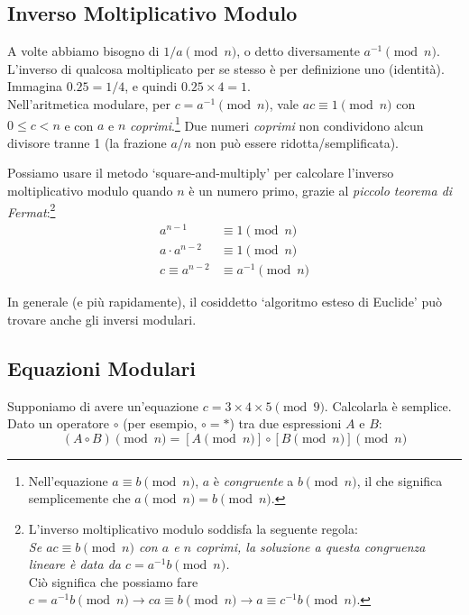 \subsection{Inverso Moltiplicativo Modulo}

A volte abbiamo bisogno di \(1/a \pmod n\), o detto diversamente \(a^{-1} \pmod n\). L'inverso di qualcosa moltiplicato per se stesso è per definizione uno (identità). Immagina \(0.25 = 1/4\), e quindi \(0.25 \times 4 = 1\).\\

Nell'aritmetica modulare, per \(c = a^{-1} \pmod{n}\), vale \(a c \equiv 1 \pmod{n}\) con \(0 \leq c < n\) e con \(a\) e \(n\) \emph{coprimi}.\footnote{Nell'equazione \(a \equiv b \pmod{n}\), \(a\) è {\em congruente} a \(b \pmod{n}\), il che significa semplicemente che \(a \pmod{n} = b \pmod{n}\).} Due numeri \emph{coprimi} non condividono alcun divisore tranne 1 (la frazione \(a/n\) non può essere ridotta/semplificata).

Possiamo usare il metodo `square-and-multiply' per calcolare l'inverso moltiplicativo modulo quando \(n\) è un numero primo, grazie al {\em piccolo teorema di Fermat}:\footnote{\label{inverse_rule_note}L'inverso moltiplicativo modulo soddisfa la seguente regola:\\
{\em Se \(a c \equiv b \pmod{n}\) con \(a\) e \(n\) coprimi, la soluzione a questa congruenza lineare è data da \(c = a^{-1} b \pmod{n}\).}\cite{wiki-modular-arithmetic}\\
Ciò significa che possiamo fare \(c = a^{-1} b \pmod n \rightarrow c a \equiv b \pmod n \rightarrow a \equiv c^{-1} b \pmod n\).}\vspace{.175cm}
\begin{align*} 
    a^{n-1} &\equiv 1 \pmod{n} \\
    a \cdot a^{n-2} &\equiv 1 \pmod{n} \\
    c \equiv a^{n-2} &\equiv a^{-1} \pmod{n}
\end{align*}

In generale (e più rapidamente), il cosiddetto `algoritmo esteso di Euclide' \cite{extended-euclidean} può trovare anche gli inversi modulari.


\subsection{Equazioni Modulari}
\label{subsec:modular-equations}

Supponiamo di avere un'equazione \(c = 3 \times 4 \times 5 \pmod 9\). Calcolarla è semplice. Dato un operatore \(\circ\) (per esempio, \(\circ = *\)) tra due espressioni \(A\) e \(B\):\vspace{.175cm}
\[(A \circ B)\pmod{n} = {[A\pmod {n}] \circ [B\pmod{n}]}\pmod{n}\]

